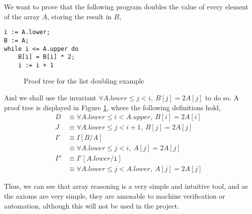 \begin{example}
  \label{exmpl:heap-double}

  We want to prove that the following program doubles the value of
  every element of the array $A$, storing the result in $B$,

\begin{verbatim}
i := A.lower;
B := A;
while i <= A.upper do
    B[i] = B[i] * 2;
    i := i + 1
\end{verbatim}

  \begin{figure}[t]
    \centering
    \begin{prooftree}




    \end{prooftree}
    \caption{Proof tree for the list doubling example}
    \label{fig:exmpl:heap-double-tree}
  \end{figure}

  And we shall use the invariant $\forall A.lower \leq j < i,\ B[j]
  = 2 A[j]$ to do so. A proof tree is displayed in Figure
  \ref{fig:exmpl:heap-double-tree}, where the following definitions hold,
  \begin{align*}
    D &\equiv \forall A.lower \leq i < A.upper,\ B[i] = 2 A[i]\\
    J &\equiv \forall A.lower \leq j < i + 1,\ B[j] = 2 A[j]\\
    I' &\equiv I[B/A]\\
    &\equiv \forall A.lower \leq j < i,\ A[j] = 2 A[j]\\
    I'' &\equiv I'[A.lower/\mathtt{i}]\\
    &\equiv \forall A.lower \leq j < A.lower,\ A[j] = 2 A[j]
  \end{align*}
\end{example}

Thus, we can see that array reasoning is a very simple and intuitive
tool, and as the axioms are very simple, they are amenable to machine
verification or automation, although this will not be used in the project.

